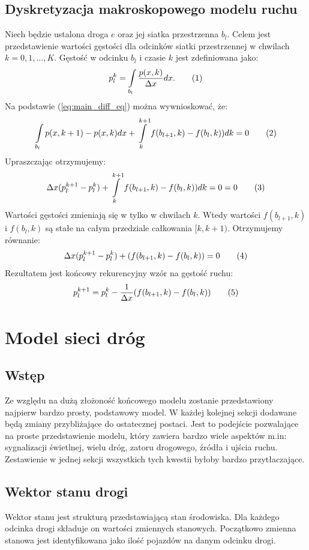 \documentclass[12pt]{book}
\theoremstyle{plain}
\newcommand\addtag{\refstepcounter{equation}
\renewcommand{\labelenumii}{\theenumii}
\renewcommand{\theenumii}{\theenumi.\arabic{enumii}.}
\tag{\theequation}}
\begin{document}
\section{Dyskretyzacja makroskopowego modelu ruchu}
Niech będzie ustalona droga $e$ oraz jej siatka przestrzenna $b_l$. Celem jest przedstawienie wartości gęstości dla odcinków siatki przestrzennej w chwilach $k=0,1,...,K$.
Gęstość w odcinku $b_l$ i czasie $k$ jest zdefiniowana jako:
\[p_{l}^{k}=\int\limits_{{b_{l}}}{\frac{p(x,k)}{\Delta x}dx}. \addtag\]
Na podstawie (\ref{eq:main_diff_eq}) można wywnioskować, że:
\[\int\limits_{b_{l}} {p(x,k+1)- p(x,k)dx} +\int\limits_{k}^{k+1} f(b_{l+1},k)-f(b_{l},k))dk=0 \addtag \label{eq:calki-LWR} \]
Upraszczając otrzymujemy:
\[\Delta x(p_l^{k+1}-p_l^{k}) +\int\limits_{k}^{k+1} f(b_{l+1},k)-f(b_{l},k))dk=0=0 \addtag \]
Wartości gęstości zmieniają się w tylko w chwilach $k$. Wtedy wartości $f(b_{l+1},k)$ i $f(b_l,k)$ są stałe na całym przedziale całkowania $[k,k+1)$. Otrzymujemy równanie:
\[\Delta x(p_l^{k+1}-p_l^{k})  + (f(b_{l+1},k)-f(b_l,k))=0 \addtag \]
Rezultatem jest końcowy rekurencyjny wzór na gęstość ruchu:
\[p_l^{k+1}=p_l^{k}  -\frac{1}{\Delta x}  (f(b_{l+1},k)-f(b_l,k)) \addtag \]


\chapter{Model sieci dróg} \label{chapter:model_sieci_drog}
\section{Wstęp}
Ze względu na dużą złożoność końcowego modelu zostanie przedstawiony najpierw bardzo prosty, podstawowy model. W każdej kolejnej sekcji dodawane będą zmiany przybliżające do ostatecznej postaci. Jest to podejście pozwalające na proste przedstawienie modelu, który zawiera bardzo wiele aspektów m.in:
sygnalizacji świetlnej, wielu dróg, zatoru drogowego, źródła i ujścia ruchu. Zestawienie w jednej sekcji wszystkich tych kwestii byłoby bardzo przytłaczające.

\section{Wektor stanu drogi} \label{sec:wektor_stanu_drogi}
Wektor stanu jest strukturą przedstawiającą stan środowiska. Dla każdego odcinka drogi składuje on wartości zmiennych stanowych. Początkowo zmienna stanowa jest identyfikowana jako ilość pojazdów na danym odcinku drogi. 
\end{document}
